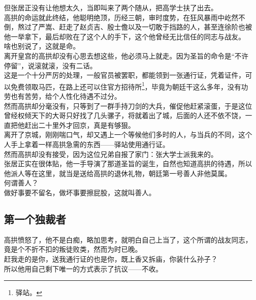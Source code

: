 \begin{multicols}{\theparacolNo}
但张居正没有让他想太久，当即叫来了两个随从，把高学士扶了出去。\\

高拱的命运就此终结，他聪明绝顶，历经三朝，审时度势，在狂风暴雨中屹然不倒，熬过了严嵩、赶走了赵贞吉、殷士儋以及一切敢于挡路的人，甚至连徐阶也被他一举拿下，最后却败在了这个人的手下，这个他曾经无比信任的同志与战友。\\

啥也别说了，这就是命。\\

离开皇宫的高拱却没有心思去想这些，他必须马上就走。因为圣旨的命令是“不许停留”，说滚就滚，没有二话。\\

这是一个十分严厉的处理，一般官员被罢职，都能领到一张通行证，凭着证件，可以免费领取马匹，在路上还可以住官方招待所\footnote{驿站。}，毕竟为朝廷干这么多年，没有功劳也有苦劳，给个人性化待遇不过分。\\

然而高拱却分毫没有，只等到了一群手持刀剑的大兵，催促他赶紧滚蛋，于是这位曾经权倾天下的大哥只好找了几头骡子，将就着出了城，后面的人还不依不饶，一直把他赶出二十里外才回京，真是有够狠。\\

离开了京城，刚刚喘口气，却又遇上一个等候他们多时的人，与当兵的不同，这个人手上拿着一样高拱急需的东西——驿站使用通行证。\\

然而高拱却没有接受，因为这位兄弟自报了家门：张大学士派我来的。\\

张居正实在很体贴，他一手导演了那道圣旨的诞生，自然也知道高拱的待遇，所以他派人等在这里，就当是送给高拱的退休礼物，朝廷第一号善人非他莫属。\\

何谓善人？\\

做好事要不留名，做坏事要擦屁股，这就叫善人。\\

\subsection{第一个独裁者}
高拱愤怒了，他不是白痴，略加思考，就明白自己上当了，这个所谓的战友同志，竟是个不折不扣的叛徒败类，然而为时已晚。\\

赶我走的是你，送我通行证的也是你，既上香又拆庙，你装什么孙子？\\

所以他用自己剩下唯一的方式表示了抗议——不收。\\


\end{multicols}
